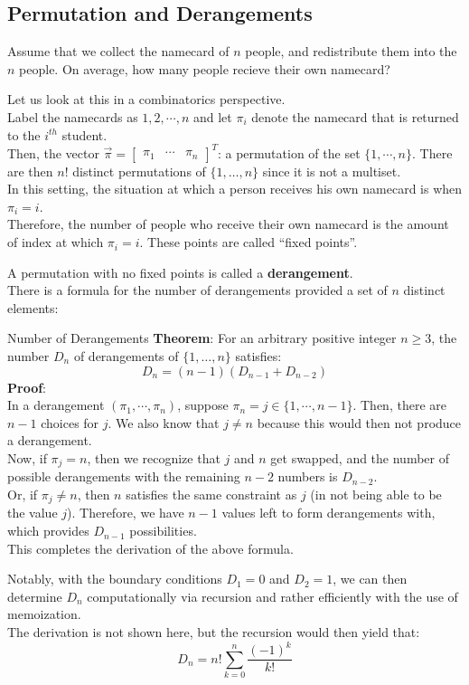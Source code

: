 \subsection{Permutation and Derangements}
Assume that we collect the namecard of $n$ people, and redistribute them into the $n$ people. On average, how many people recieve their own namecard?

Let us look at this in a combinatorics perspective. \\
Label the namecards as $1, 2, \cdots, n$ and let $\pi_i$ denote the namecard that is returned to the $i^{th}$ student. \\
Then, the vector $\vec{\pi} = \begin{bmatrix} \pi_1 & \cdots & \pi_n \end{bmatrix}^T$: a permutation of the set $\{1, \cdots, n\}$. There are then $n!$ distinct permutations of $\{1, \dots, n\}$ since it is not a multiset. \\
In this setting, the situation at which a person receives his own namecard is when $\pi_i = i$. \\
Therefore, the number of people who receive their own namecard is the amount of index at which $\pi_i = i$. These points are called ``fixed points''.

A permutation with no fixed points is called a \textbf{derangement}. \\
There is a formula for the number of derangements provided a set of $n$ distinct elements:
\begin{ln-theorem}{Number of Derangements}{}
    \textbf{Theorem}: For an arbitrary positive integer $n \geq 3$, the number $D_n$ of derangements of $\{1, \dots, n\}$ satisfies:
    \[D_n = (n - 1)(D_{n - 1} + D_{n - 2})\]
    \tcblower
    \textbf{Proof}: \\
    In a derangement $(\pi_1, \cdots, \pi_n)$, suppose $\pi_n = j \in \{1, \cdots, n - 1\}$. Then, there are $n - 1$ choices for $j$. We also know that $j \neq n$ because this would then not produce a derangement. \\
    Now, if $\pi_j = n$, then we recognize that $j$ and $n$ get swapped, and the number of possible derangements with the remaining $n - 2$ numbers is $D_{n - 2}$. \\
    Or, if $\pi_j \neq n$, then $n$ satisfies the same constraint as $j$ (in not being able to be the value $j$). Therefore, we have $n - 1$ values left to form derangements with, which provides $D_{n - 1}$ possibilities. \\
    This completes the derivation of the above formula.
\end{ln-theorem}
Notably, with the boundary conditions $D_1 = 0$ and $D_2 = 1$, we can then determine $D_n$ computationally via recursion and rather efficiently with the use of memoization. \\
The derivation is not shown here, but the recursion would then yield that:
\[D_n = n! \sum_{k = 0}^n \frac{{(-1)}^k}{k!}\]

